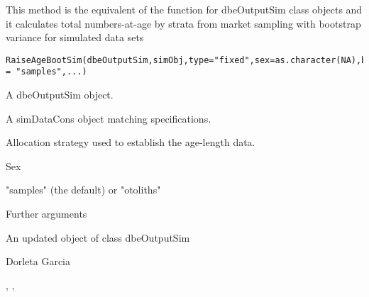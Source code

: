 \begin{Description}\relax
This method is the equivalent of the function  for dbeOutputSim class objects and 
it calculates total numbers-at-age by strata from market sampling with bootstrap variance for simulated data sets
\end{Description}
\begin{Usage}
\begin{verbatim}
RaiseAgeBootSim(dbeOutputSim,simObj,type="fixed",sex=as.character(NA),bootMethod = "samples",...)
\end{verbatim}
\end{Usage}
\begin{Arguments}
\begin{ldescription}
\item[\code{dbeOutputSim}] A dbeOutputSim object.
\item[\code{simObj}] A simDataCons object matching  specifications.
\item[\code{type}] Allocation strategy used to establish the age-length data.
\item[\code{sex}] Sex
\item[\code{bootMethod}] "samples" (the default) or "otoliths"
\item[\code{...}] Further arguments
\end{ldescription}
\end{Arguments}
\begin{Value}
An updated object of class dbeOutputSim
\end{Value}
\begin{Author}\relax
Dorleta Garcia 
\end{Author}
\begin{SeeAlso}\relax
{}, , 
\end{SeeAlso}

